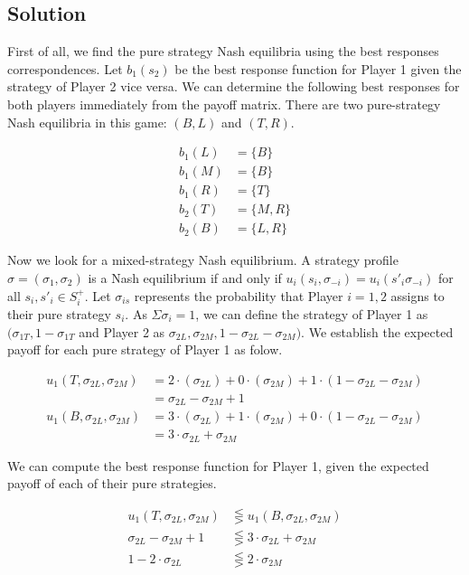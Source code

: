 \documentclass[10pt,a4paper]{article}
\begin{document}
\subsection*{Solution} 
First of all, we find the pure strategy Nash equilibria using the best responses correspondences. Let $b_1(s_2)$ be the best response function for Player 1 given the strategy of Player 2 vice versa. We can determine the following best responses for both players immediately from the payoff matrix. There are two pure-strategy Nash equilibria in this game: $(B,L)$ and $(T,R)$.

\begin{align*}
b_1(L) &= \{B\} \\ 
b_1(M) &= \{B\} \\
b_1(R) &= \{T\} \\
b_2(T) &= \{M,R\} \\
b_2(B) &= \{L,R\} 
\end{align*}

Now we look for a mixed-strategy Nash equilibrium. A strategy profile $\sigma = (\sigma_1, \sigma_2)$ is a Nash equilibrium if and only if $u_i(s_i,\sigma_{-i}) = u_i(s'_i \sigma_{-i})$ for all $s_i, s'_i \in S^+_i$. Let $\sigma_{is}$ represents the probability that Player $i = 1,2$ assigns to their pure strategy $s_i$. As $\Sigma \sigma_i = 1$, we can define the strategy of Player 1 as $(\sigma_{1T},1-\sigma_{1T}$ and Player 2 as $\sigma_{2L}, \sigma_{2M}, 1-\sigma_{2L}-\sigma_{2M})$. We establish the expected payoff for each pure strategy of Player 1 as folow.

\begin{align*}
u_1 (T, \sigma_{2L}, \sigma_{2M}) &= 2\cdot(\sigma_{2L}) + 0\cdot(\sigma_{2M}) + 1\cdot(1-\sigma_{2L}-\sigma_{2M}) \\
&= \sigma_{2L} - \sigma_{2M} + 1 \\
u_1 (B, \sigma_{2L}, \sigma_{2M}) &= 3\cdot(\sigma_{2L}) + 1\cdot(\sigma_{2M}) + 0\cdot(1-\sigma_{2L}-\sigma_{2M}) \\
&= 3\cdot\sigma_{2L} + \sigma_{2M}
\end{align*}

We can compute the best response function for Player 1, given the expected payoff of each of their pure strategies.

\begin{align*}
u_1(T, \sigma_{2L}, \sigma_{2M}) &\lesseqgtr u_1(B, \sigma_{2L}, \sigma_{2M}) \\
\sigma_{2L} - \sigma_{2M} + 1  &\lesseqgtr 3\cdot\sigma_{2L} + \sigma_{2M} \\
1 - 2 \cdot \sigma_{2L} &\lesseqgtr 2 \cdot \sigma_{2M}
\end{align*}
\end{document}
